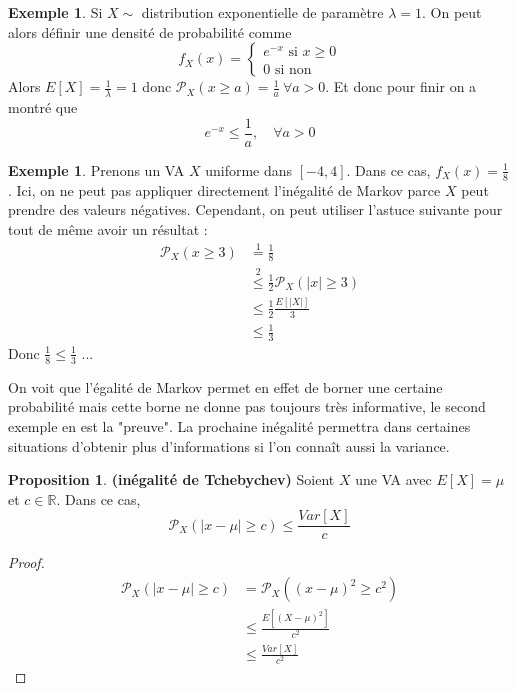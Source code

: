 \documentclass[a4paper,12pt]{report}
\theoremstyle{definition}
\newcommand{\R}{\mathbb{R}}
\renewcommand{\(}{\left(}
\renewcommand{\)}{\right)}
\renewcommand{\b}{\textbf}
\renewcommand{\P}{\mathcal{P}}
\renewcommand{\t}{\text}
\newtheorem{exmp}[thm]{Exemple}
\newtheorem{prop}[thm]{Proposition}
\begin{document}
        \begin{exmp} Si $X\sim $ distribution exponentielle de paramètre $\lambda=1$. On peut alors définir une densité de probabilité comme
            $$f_X(x)=\begin{cases}
            e^{-x} \t{ si } x\geq 0 \\
            0 \t{ si non}
            \end{cases}$$
            Alors $E[X]=\frac{1}{\lambda} = 1$ donc $\P_X(x\geq a) = \frac{1}{a} ~\forall a >0$. Et donc pour finir on a montré que 
            $$e^{-x}\leq \frac{1}{a}, \quad \forall a >0$$
        \end{exmp}  
                
        \begin{exmp} Prenons un VA $X$ uniforme dans $[-4,4]$. Dans ce cas, $f_X(x)=\frac{1}{8}$. Ici, on ne peut pas appliquer directement l'inégalité de Markov parce $X$ peut prendre des valeurs négatives. Cependant, on peut utiliser l'astuce suivante pour tout de même avoir un résultat :
            \begin{align*}
                \P_X(x\geq3) &\stackrel{1}{=} \frac{1}{8}\\
                &\stackrel{2}{\leq} \frac{1}{2}\P_X(|x|\geq 3) \\
                &\leq \frac{1}{2} \frac{E[|X|]}{3} \\
                &\leq \frac{1}{3}
            \end{align*}
            Donc $\frac{1}{8}\leq \frac{1}{3}$ ...
            \label{ex1}
        \end{exmp}
        
        On voit que l'égalité de Markov permet en effet de borner une certaine probabilité mais cette borne ne donne pas toujours très informative, le second exemple en est la "preuve". La prochaine inégalité permettra dans certaines situations d'obtenir plus d'informations si l'on connaît aussi la variance.
        
        \begin{leftbar}
        \begin{prop}\b{(inégalité de Tchebychev)}
            Soient $X$ une VA avec $E[X]=\mu$ et $c\in\R$. Dans ce cas,
            $$\P_X(|x-\mu|\geq c)\leq \frac{Var[X]}{c}$$
        \end{prop}
        \end{leftbar}
        
        \begin{proof}
            \begin{align*}
                \P_X(|x-\mu|\geq c) &= \P_X((x-\mu)^2\geq c^2)\\
                &\leq \frac{E[(X-\mu)^2]}{c^2} \\
                &\leq \frac{Var[X]}{c^2}
            \end{align*}
        \end{proof}
        
\end{document}
